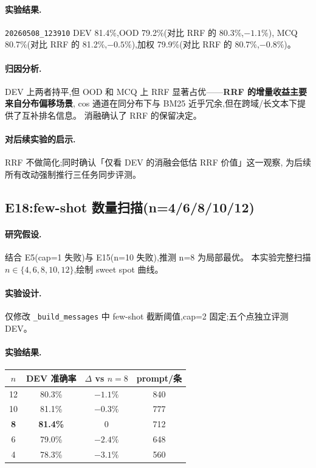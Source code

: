 \documentclass[11pt,a4paper]{ctexart}
\begin{document}
\paragraph{实验结果.}\texttt{20260508\_123910} DEV 81.4\%,OOD 79.2\%(对比 RRF 的 80.3\%,$-1.1\%$),
MCQ 80.7\%(对比 RRF 的 81.2\%,$-0.5\%$),加权 79.9\%(对比 RRF 的 80.7\%,$-0.8\%$)。

\paragraph{归因分析.}DEV 上两者持平,但 OOD 和 MCQ 上 RRF 显著占优——\textbf{RRF 的增量收益主要来自分布偏移场景},
cos 通道在同分布下与 BM25 近乎冗余,但在跨域/长文本下提供了互补排名信息。
消融确认了 RRF 的保留决定。

\paragraph{对后续实验的启示.}RRF 不做简化;同时确认「仅看 DEV 的消融会低估 RRF 价值」这一观察,
为后续所有改动强制推行三任务同步评测。

\subsection{E18:few-shot 数量扫描(n=4/6/8/10/12)}

\paragraph{研究假设.}结合 E5(cap=1 失败)与 E15(n=10 失败),推测 n=8 为局部最优。
本实验完整扫描 $n \in \{4, 6, 8, 10, 12\}$,绘制 sweet spot 曲线。

\paragraph{实验设计.}仅修改 \texttt{\_build\_messages} 中 few-shot 截断阈值,cap=2 固定;五个点独立评测 DEV。

\paragraph{实验结果.}

\begin{table}[h]
\centering
\small
\begin{tabular}{cccc}
\toprule
$n$ & DEV 准确率 & $\Delta$ vs $n=8$ & prompt/条 \\
\midrule
12 & 80.3\% & $-1.1\%$ & 840 \\
10 & 81.1\% & $-0.3\%$ & 777 \\
\textbf{8}  & \textbf{81.4\%} & 0 & 712 \\
6  & 79.0\% & $-2.4\%$ & 648 \\
4  & 78.3\% & $-3.1\%$ & 560 \\
\bottomrule
\end{tabular}
\end{table}
\end{document}
